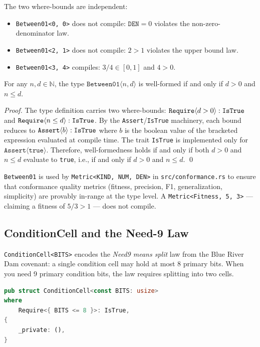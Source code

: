 The two where-bounds are independent:
\begin{itemize}
  \item \texttt{Between01<0, 0>} does not compile: $\texttt{DEN} = 0$ violates
    the non-zero-denominator law.
  \item \texttt{Between01<2, 1>} does not compile: $2 > 1$ violates the upper
    bound law.
  \item \texttt{Between01<3, 4>} compiles: $3/4 \in [0,1]$ and $4 > 0$.
\end{itemize}

\begin{theorem}
  \label{thm:between01}
  For any $n, d \in \mathbb{N}$, the type $\texttt{Between01}\langle n, d \rangle$
  is well-formed if and only if $d > 0$ and $n \leq d$.
\end{theorem}

\begin{proof}
  The type definition carries two where-bounds:
  $\texttt{Require}\langle d > 0 \rangle : \texttt{IsTrue}$ and $\texttt{Require}\langle n \leq d \rangle : \texttt{IsTrue}$.
  By the \texttt{Assert}/\texttt{IsTrue} machinery, each bound reduces to
  $\texttt{Assert}\langle b \rangle : \texttt{IsTrue}$ where $b$ is the boolean value
  of the bracketed expression evaluated at compile time. The trait
  \texttt{IsTrue} is implemented only for $\texttt{Assert}\langle\texttt{true}\rangle$.
  Therefore, well-formedness holds if and only if both $d > 0$ and $n \leq d$
  evaluate to \texttt{true}, i.e., if and only if $d > 0$ and $n \leq d$.
  \qed
\end{proof}

\texttt{Between01} is used by \texttt{Metric<KIND, NUM, DEN>} in
\texttt{src/conformance.rs} to ensure that conformance quality metrics
(fitness, precision, F1, generalization, simplicity) are provably in-range at
the type level. A \texttt{Metric<Fitness, 5, 3>} --- claiming a fitness of
$5/3 > 1$ --- does not compile.

\subsection{ConditionCell and the Need-9 Law}

\texttt{ConditionCell<BITS>} encodes the \emph{Need9 means split} law from the
Blue River Dam covenant: a single condition cell may hold at most 8 primary
bits. When you need 9 primary condition bits, the law requires splitting into
two cells.

\begin{lstlisting}[language=Rust, caption={\texttt{ConditionCell<BITS>}: the
  Need9 law as a type constraint.}, label={lst:conditioncell}]
pub struct ConditionCell<const BITS: usize>
where
    Require<{ BITS <= 8 }>: IsTrue,
{
    _private: (),
}
\end{lstlisting}

